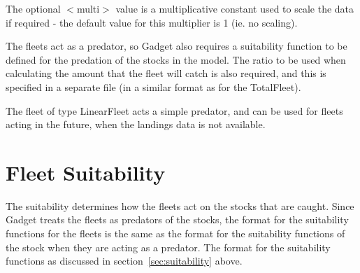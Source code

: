 \documentclass [a4paper, 10pt]{book}
\begin{document}
The optional $<$multi$>$ value is a multiplicative constant used to scale the data if required - the default value for this multiplier is 1 (ie. no scaling).

\bigskip
The fleets act as a predator, so Gadget also requires a suitability function to be defined for the predation of the stocks in the model.  The ratio to be used when calculating the amount that the fleet will catch is also required, and this is specified in a separate file (in a similar format as for the TotalFleet).

\bigskip
The fleet of type LinearFleet acts a simple predator, and can be used for fleets acting in the future, when the landings data is not available.





\section{Fleet Suitability}\label{sec:fleetsuit}
The suitability determines how the fleets act on the stocks that are caught.  Since Gadget treats the fleets as predators of the stocks, the format for the suitability functions for the fleets is the same as the format for the suitability functions of the stock when they are acting as a predator.  The format for the suitability functions as discussed in section~\ref{sec:suitability} above.
\end{document}
